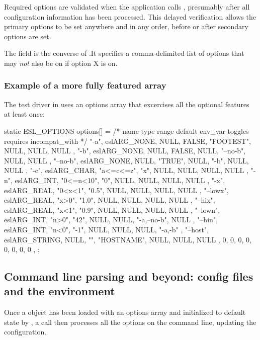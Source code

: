 Required options are validated when the application calls
, presumably after all configuration
information has been processed. This delayed verification allows the
primary options to be set anywhere and in any order, before or after
secondary options are set.

The  field is the converse of
.It specifies a comma-delimited list of options
that may \emph{not} also be on if option X is on.

   \subsubsection{Example of a more fully featured  array}

The test driver in  uses an options array that
excercises all the optional features at least once:

\begin{cchunk}
static ESL_OPTIONS options[] = {
  /* name          type         range   default   env_var  toggles  requires incompat_with */
  { "-a",     eslARG_NONE,       NULL,   FALSE, "FOOTEST",   NULL,    NULL,        NULL },
  { "-b",     eslARG_NONE,       NULL,   FALSE,     NULL, "--no-b",   NULL,        NULL },
  { "--no-b", eslARG_NONE,       NULL,  "TRUE",     NULL,     "-b",   NULL,        NULL },
  { "-c",     eslARG_CHAR,  "a<=c<=z",    "x",      NULL,    NULL,    NULL,        NULL },
  { "-n",     eslARG_INT,   "0<=n<10",    "0",      NULL,    NULL,    NULL,        NULL },
  { "-x",     eslARG_REAL,    "0<x<1",  "0.5",      NULL,    NULL,    NULL,        NULL },
  { "--lowx", eslARG_REAL,      "x>0",  "1.0",      NULL,    NULL,    NULL,        NULL },
  { "--hix",  eslARG_REAL,      "x<1",  "0.9",      NULL,    NULL,    NULL,        NULL },
  { "--lown", eslARG_INT,       "n>0",   "42",      NULL,    NULL, "-a,--no-b",    NULL },
  { "--hin",  eslARG_INT,       "n<0",   "-1",      NULL,    NULL,    NULL,     "-a,-b" },
  { "--host", eslARG_STRING,     NULL,      "", "HOSTNAME",  NULL,    NULL,        NULL },
  {  0, 0, 0, 0, 0, 0, 0, 0 },
};
\end{cchunk}

\subsection{Command line parsing and beyond: config files and the environment}

Once a  object has been loaded with an options
array and initialized to default state by
, a 
call then processes all the options on the command line, updating the
configuration. 

